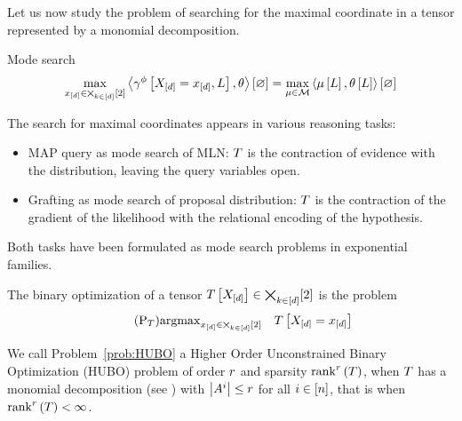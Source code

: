 
Let us now study the problem of searching for the maximal coordinate in a tensor represented by a monomial decomposition. 



Mode search 
\begin{align*}
	\max_{x_{[d]}\in\bigtimes_{k\in[d]}[2]} \left\langle \gamma^{\phi}\left[X_{[d]}=x_{[d]},L\right],\theta\right\rangle \left[ \varnothing \right] 
	= \max_{\mu\in\mathcal{M}} \left\langle \mu\left[L\right],\theta\left[L\right]\right\rangle \left[ \varnothing \right]
\end{align*}


The search for maximal coordinates appears in various reasoning tasks:
\begin{itemize}
	\item MAP query as mode search of MLN: $T$ is the contraction of evidence with the distribution, leaving the query variables open.
	\item Grafting as mode search of proposal distribution: $T$ is the contraction of the gradient of the likelihood with the relational encoding of the hypothesis.
\end{itemize}
Both tasks have been formulated as mode search problems in exponential families.






\begin{definition}
	The binary optimization of a tensor $T\left[X_{[d]}\right]\in\bigtimes_{k\in[d]}[2]$ is the problem
	\begin{align}\tag{$\mathrm{P}_{\hypercore}$}\label{prob:HUBO}
		\argmax_{\shortcatindices\in\atomstates} \quad \hypercoreat{\indexedshortcatvariables} 
	\end{align}
	
	We call Problem~\ref{prob:HUBO} a Higher Order Unconstrained Binary Optimization (HUBO) problem of order $r$ and sparsity $\mathrm{rank}^{r}\left(T\right)$, when $T$ has a monomial decomposition (see ) with $\left|A^{i}\right|\leq r$ for all $i\in[n]$, that is when $\mathrm{rank}^{r}\left(T\right)<\infty$.
	
	
\end{definition}


